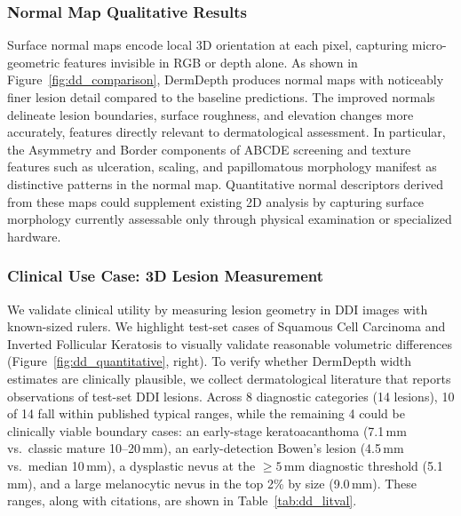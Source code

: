 \documentclass[11pt]{ucthesis}
\begin{document}
\subsubsection{Normal Map Qualitative Results}\label{sec:dd_normals}

Surface normal maps encode local 3D orientation at each pixel, capturing micro-geometric features invisible in RGB or depth alone. As shown in Figure~\ref{fig:dd_comparison}, DermDepth produces normal maps with noticeably finer lesion detail compared to the baseline predictions. The improved normals delineate lesion boundaries, surface roughness, and elevation changes more accurately, features directly relevant to dermatological assessment. In particular, the Asymmetry and Border components of ABCDE screening \cite{blum-2003} and texture features such as ulceration, scaling, and papillomatous morphology manifest as distinctive patterns in the normal map. Quantitative normal descriptors derived from these maps could supplement existing 2D analysis by capturing surface morphology currently assessable only through physical examination or specialized hardware.

\subsubsection{Clinical Use Case: 3D Lesion Measurement}\label{sec:dd_measurement}

We validate clinical utility by measuring lesion geometry in DDI images with known-sized rulers. We highlight test-set cases of Squamous Cell Carcinoma and Inverted Follicular Keratosis to visually validate reasonable volumetric differences (Figure~\ref{fig:dd_quantitative}, right). To verify whether DermDepth width estimates are clinically plausible, we collect dermatological literature that reports observations of test-set DDI lesions. Across 8 diagnostic categories (14 lesions), 10 of 14 fall within published typical ranges, while the remaining 4 could be clinically viable boundary cases: an early-stage keratoacanthoma (7.1\,mm vs.\ classic mature 10--20\,mm), an early-detection Bowen's lesion (4.5\,mm vs.\ median 10\,mm), a dysplastic nevus at the $\geq5$\,mm diagnostic threshold (5.1\,mm), and a large melanocytic nevus in the top 2\% by size (9.0\,mm). These ranges, along with citations, are shown in Table~\ref{tab:dd_litval}.
\end{document}
